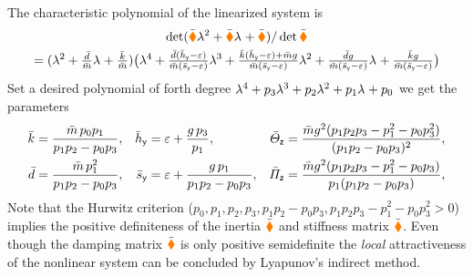 The characteristic polynomial of the linearized system is
\begin{multline}
 \det(\bar{\boldsymbol{\textcolor{orange}{\blacklozenge}}} \lambda_{}^2 + \bar{\boldsymbol{\textcolor{orange}{\blacklozenge}}} \lambda_{} + \bar{\boldsymbol{\textcolor{orange}{\blacklozenge}}}) / \det\bar{\boldsymbol{\textcolor{orange}{\blacklozenge}}}
\\
 = (\lambda_{}^2 + \tfrac{\bar{d}}{\bar{m}} \lambda_{} + \tfrac{\bar{k}}{\bar{m}})
 \big(\lambda_{}^4
 + \tfrac{\bar{d}(\bar{h}_{\mathsf{y}}-\varepsilon)}{\bar{m}(\bar{s}_{\mathsf{y}}-\varepsilon)} \lambda_{}^3
 + \tfrac{\bar{k}(\bar{h}_{\mathsf{y}}-\varepsilon) + \bar{m} g}{\bar{m}(\bar{s}_{\mathsf{y}}-\varepsilon)} \lambda_{}^2
 + \tfrac{\bar{d} g}{\bar{m} (\bar{s}_{\mathsf{y}}-\varepsilon)} \lambda_{}
 + \tfrac{\bar{k} g}{\bar{m} (\bar{s}_{\mathsf{y}}-\varepsilon)} \big)
\end{multline}
Set a desired polynomial of forth degree $\lambda_{}^4 + p_3 \lambda_{}^3 + p_2 \lambda_{}^2 + p_1 \lambda_{} + p_0$ we get the parameters
\begin{align}
 \bar{k} &= \frac{\bar{m} \, p_0 p_1}{p_1 p_2 - p_0 p_3},&
 \bar{h}_{\mathsf{y}} &= \varepsilon + \frac{g\, p_3}{p_1},&
 \bar{\varTheta}_{\mathsf{z}} &= \frac{\bar{m} g^2 (p_1 p_2 p_3 - p_1^2 - p_0 p_3^2)}{(p_1 p_2 - p_0 p_3)^2},
\\
 \bar{d} &= \frac{\bar{m}\, p_1^2}{p_1 p_2 - p_0 p_3},&
 \bar{s}_{\mathsf{y}} &= \varepsilon + \frac{g\, p_1}{p_1 p_2 - p_0 p_3},&
 \bar{\varPi}_{\mathsf{z}} &= \frac{\bar{m} g^2 (p_1 p_2 p_3 - p_1^2 - p_0 p_3)}{p_1 (p_1 p_2 - p_0 p_3)}, 
\end{align}
Note that the Hurwitz criterion ($p_0, p_1, p_2, p_3, p_1 p_2 - p_0 p_3, p_1 p_2 p_3 - p_1^2 - p_0 p_3^2 > 0$) implies the positive definiteness of the inertia $\bar{\boldsymbol{\textcolor{orange}{\blacklozenge}}}$ and stiffness matrix $\bar{\boldsymbol{\textcolor{orange}{\blacklozenge}}}$.
Even though the damping matrix $\bar{\boldsymbol{\textcolor{orange}{\blacklozenge}}}$ is only positive semidefinite the \textit{local} attractiveness of the nonlinear system can be concluded by Lyapunov's indirect method.

